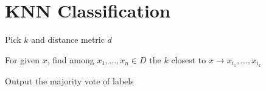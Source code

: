 \section*{KNN Classification}

\begin{compactitem}
	\item Pick $k$ and distance metric $d$
	\item For given $x$, find among $x_1,...,x_n \in D$ the $k$ closest to $x \to x_{i_1},..., x_{i_k}$
	\item Output the majority vote of labels
\end{compactitem}